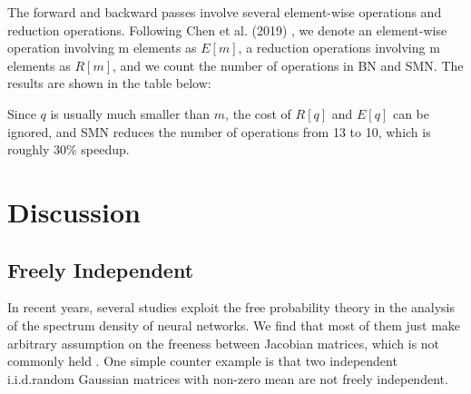 \documentclass[10pt,journal,compsoc]{IEEEtran}
\begin{document}
{The forward and backward passes involve several element-wise operations and reduction operations. Following Chen et al. (2019) \cite{chen2019effective}, we denote an element-wise operation involving m elements as $E[m]$, a reduction operations involving m elements as $R[m]$, and we count the number of operations in BN and SMN. The results are shown in the table below:
\begin{table}[htbp]
\caption{Number of ops in BN and SMN.}
\centering
{}
\label{tab:ops_in_bn_sbn}
\end{table}
Since $q$ is usually much smaller than $m$, the cost of $R[q]$ and $E[q]$ can be ignored, and SMN reduces the number of operations from 13 to 10, which is roughly 30\% speedup.
} \label{appendix:l2n_overhead}
\section{Discussion}

\subsection{Freely Independent}

In recent years, several studies exploit the free probability theory in the analysis of the spectrum density of neural networks\cite{pennington2017resurrecting, ling2018spectrum, tarnowski2018dynamical, pennington2018emergence}. We find that most of them just make arbitrary assumption on the freeness between Jacobian matrices, which is not commonly held \cite{chen2012partial}. One simple counter example is that two independent i.i.d.random Gaussian matrices with non-zero mean are not freely independent. 
\end{document}
